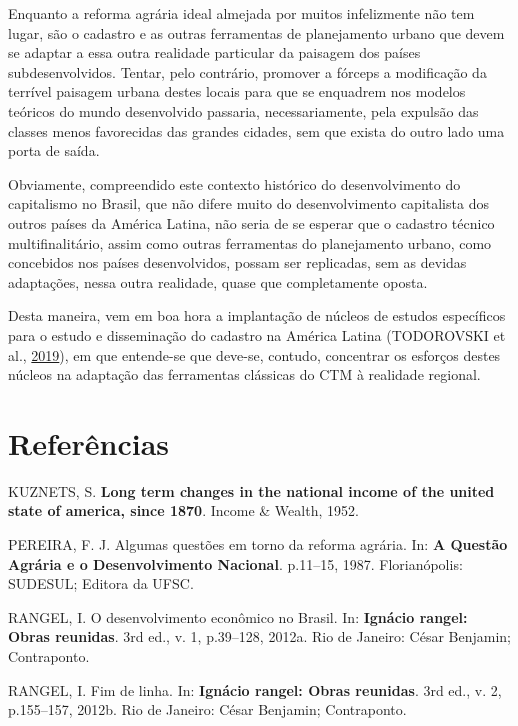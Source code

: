 \documentclass[a4paper, 12pt]{article}
\begin{document}
Enquanto a reforma agrária ideal almejada por muitos infelizmente não
tem lugar, são o cadastro e as outras ferramentas de planejamento urbano
que devem se adaptar a essa outra realidade particular da paisagem dos
países subdesenvolvidos. Tentar, pelo contrário, promover a fórceps a
modificação da terrível paisagem urbana destes locais para que se
enquadrem nos modelos teóricos do mundo desenvolvido passaria,
necessariamente, pela expulsão das classes menos favorecidas das grandes
cidades, sem que exista do outro lado uma porta de saída.

Obviamente, compreendido este contexto histórico do desenvolvimento do
capitalismo no Brasil, que não difere muito do desenvolvimento
capitalista dos outros países da América Latina, não seria de se esperar
que o cadastro técnico multifinalitário, assim como outras ferramentas
do planejamento urbano, como concebidos nos países desenvolvidos, possam
ser replicadas, sem as devidas adaptações, nessa outra realidade, quase
que completamente oposta.

Desta maneira, vem em boa hora a implantação de núcleos de estudos
específicos para o estudo e disseminação do cadastro na América Latina
(TODOROVSKI et al., \protect\hyperlink{ref-lalan}{2019}), em que
entende-se que deve-se, contudo, concentrar os esforços destes núcleos
na adaptação das ferramentas clássicas do CTM à realidade regional.

\hypertarget{referencias}{%
\section*{Referências}\label{referencias}}

\hypertarget{refs}{}
\leavevmode\hypertarget{ref-kuznets}{}%
KUZNETS, S. \textbf{Long term changes in the national income of the
united state of america, since 1870}. Income \& Wealth, 1952.

\leavevmode\hypertarget{ref-questaoagraria}{}%
PEREIRA, F. J. Algumas questões em torno da reforma agrária. In:
\textbf{A Questão Agrária e o Desenvolvimento Nacional}. p.11--15, 1987.
Florianópolis: SUDESUL; Editora da UFSC.

\leavevmode\hypertarget{ref-rangel1954}{}%
RANGEL, I. O desenvolvimento econômico no Brasil. In: \textbf{Ignácio
rangel: Obras reunidas}. 3rd ed., v. 1, p.39--128, 2012a. Rio de
Janeiro: César Benjamin; Contraponto.

\leavevmode\hypertarget{ref-rangel1988}{}%
RANGEL, I. Fim de linha. In: \textbf{Ignácio rangel: Obras reunidas}.
3rd ed., v. 2, p.155--157, 2012b. Rio de Janeiro: César Benjamin;
Contraponto.
\end{document}
